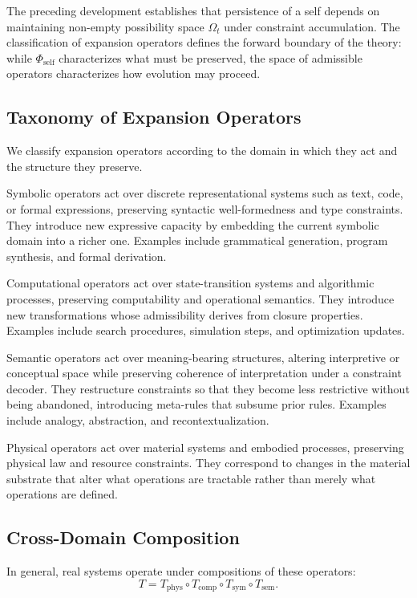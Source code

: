 \documentclass[12pt, a4paper]{article}
\theoremstyle{plain}
\theoremstyle{definition}
\theoremstyle{remark}
\begin{document}
The preceding development establishes that persistence of a self depends on maintaining non-empty possibility space $\Omega_t$ under constraint accumulation. The classification of expansion operators defines the forward boundary of the theory: while $\Phi_{\mathrm{self}}$ characterizes what must be preserved, the space of admissible operators characterizes how evolution may proceed.

\subsection{Taxonomy of Expansion Operators}

We classify expansion operators according to the domain in which they act and the structure they preserve.

Symbolic operators act over discrete representational systems such as text, code, or formal expressions, preserving syntactic well-formedness and type constraints. They introduce new expressive capacity by embedding the current symbolic domain into a richer one. Examples include grammatical generation, program synthesis, and formal derivation.

Computational operators act over state-transition systems and algorithmic processes, preserving computability and operational semantics. They introduce new transformations whose admissibility derives from closure properties. Examples include search procedures, simulation steps, and optimization updates.

Semantic operators act over meaning-bearing structures, altering interpretive or conceptual space while preserving coherence of interpretation under a constraint decoder. They restructure constraints so that they become less restrictive without being abandoned, introducing meta-rules that subsume prior rules. Examples include analogy, abstraction, and recontextualization.

Physical operators act over material systems and embodied processes, preserving physical law and resource constraints. They correspond to changes in the material substrate that alter what operations are tractable rather than merely what operations are defined.

\subsection{Cross-Domain Composition}

In general, real systems operate under compositions of these operators:
\[
T = T_{\mathrm{phys}} \circ T_{\mathrm{comp}} \circ T_{\mathrm{sym}} \circ T_{\mathrm{sem}}.
\]
\end{document}
